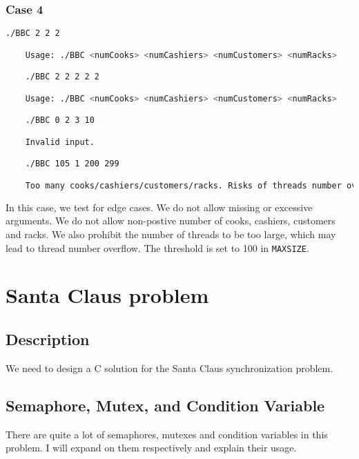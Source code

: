 \subsubsection{Case 4}
\begin{lstlisting}[language=bash]
    ./BBC 2 2 2

    Usage: ./BBC <numCooks> <numCashiers> <numCustomers> <numRacks>

    ./BBC 2 2 2 2 2

    Usage: ./BBC <numCooks> <numCashiers> <numCustomers> <numRacks>

    ./BBC 0 2 3 10

    Invalid input.

    ./BBC 105 1 200 299

    Too many cooks/cashiers/customers/racks. Risks of threads number overflow.

\end{lstlisting}

In this case, we test for edge cases. We do not allow missing or excessive arguments. We do not allow non-postive number of cooks, cashiers, customers and racks.
We also prohibit the number of threads to be too large, which may lead to thread number overflow. The threshold is set to 100 in \texttt{MAXSIZE}.

\section{Santa Claus problem}
\subsection{Description}
We need to design a C solution for the Santa Claus synchronization problem.

\subsection{Semaphore, Mutex, and Condition Variable}
There are quite a lot of semaphores, mutexes and condition variables in this problem. I will expand 
on them respectively and explain their usage.

